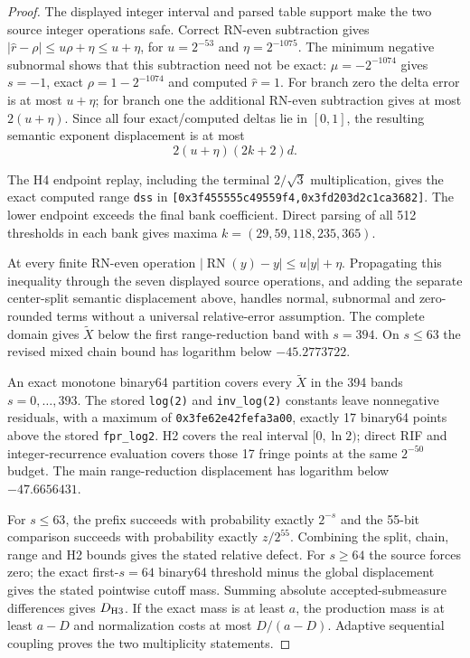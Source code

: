 \begin{proof}
The displayed integer interval and parsed table support make the two source
integer operations safe.  Correct RN-even subtraction gives
$|\widehat r-\rho|\le u\rho+\eta\le u+\eta$, for $u=2^{-53}$ and
$\eta=2^{-1075}$.  The minimum negative subnormal shows that this subtraction
need not be exact: $\mu=-2^{-1074}$ gives $s=-1$, exact
$\rho=1-2^{-1074}$ and computed $\widehat r=1$.  For branch zero the delta
error is at most $u+\eta$; for branch one the additional RN-even subtraction
gives at most $2(u+\eta)$.  Since all four exact/computed deltas lie in
$[0,1]$, the resulting semantic exponent displacement is at most
\[
 2(u+\eta)(2k+2)d.
\]

The H4 endpoint replay, including the terminal $2/\sqrt3$ multiplication,
gives the exact computed range
\texttt{dss} in
\texttt{[0x3f455555c49559f4,0x3fd203d2c1ca3682]}.
The lower endpoint exceeds the final bank coefficient.  Direct parsing of
all 512 thresholds in each bank gives maxima
$k=(29,59,118,235,365)$.

At every finite RN-even operation
$|\operatorname{RN}(y)-y|\le u|y|+\eta$.  Propagating this inequality through
the seven displayed source operations, and adding the separate center-split
semantic displacement above, handles normal, subnormal and zero-rounded
terms without a universal relative-error assumption.  The complete domain
gives $\widetilde X$ below the first range-reduction band with $s=394$.  On
$s\le63$ the revised mixed chain bound has logarithm below $-45.2773722$.

An exact monotone binary64 partition covers every $\widetilde X$ in the 394
bands $s=0,\ldots,393$.  The stored \texttt{log(2)} and
\texttt{inv\_log(2)} constants leave nonnegative residuals, with a maximum
of \texttt{0x3fe62e42fefa3a00}, exactly 17 binary64 points above the stored
\texttt{fpr\_log2}.  H2 covers the real interval $[0,\ln2)$; direct RIF and
integer-recurrence evaluation covers those 17 fringe points at the same
$2^{-50}$ budget.  The main range-reduction displacement has logarithm below
$-47.6656431$.

For $s\le63$, the prefix succeeds with probability exactly $2^{-s}$ and the
55-bit comparison succeeds with probability exactly $z/2^{55}$.  Combining
the split, chain, range and H2 bounds gives the stated relative defect.  For
$s\ge64$ the source forces zero; the exact first-$s=64$ binary64 threshold
minus the global displacement gives the stated pointwise cutoff mass.
Summing absolute accepted-submeasure differences gives $D_{\rm H3}$.
If the exact mass is at least $a$, the production mass is at least $a-D$ and
normalization costs at most $D/(a-D)$.  Adaptive sequential coupling proves
the two multiplicity statements.
\end{proof}

